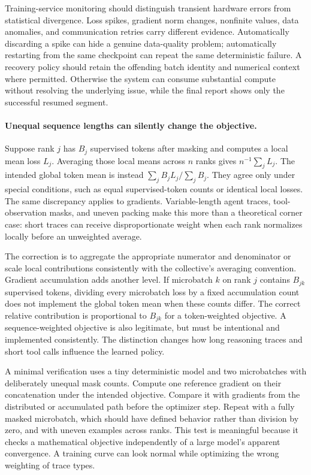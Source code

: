 Training-service monitoring should distinguish transient hardware errors from statistical divergence. Loss spikes, gradient norm changes, nonfinite values, data anomalies, and communication retries carry different evidence. Automatically discarding a spike can hide a genuine data-quality problem; automatically restarting from the same checkpoint can repeat the same deterministic failure. A recovery policy should retain the offending batch identity and numerical context where permitted. Otherwise the system can consume substantial compute without resolving the underlying issue, while the final report shows only the successful resumed segment.

\paragraph{Unequal sequence lengths can silently change the objective.}
Suppose rank $j$ has $B_j$ supervised tokens after masking and computes a local mean loss $L_j$. Averaging those local means across $n$ ranks gives $n^{-1}\sum_jL_j$. The intended global token mean is instead $\sum_j B_jL_j/\sum_jB_j$. They agree only under special conditions, such as equal supervised-token counts or identical local losses. The same discrepancy applies to gradients. Variable-length agent traces, tool-observation masks, and uneven packing make this more than a theoretical corner case: short traces can receive disproportionate weight when each rank normalizes locally before an unweighted average.

The correction is to aggregate the appropriate numerator and denominator or scale local contributions consistently with the collective's averaging convention. Gradient accumulation adds another level. If microbatch $k$ on rank $j$ contains $B_{jk}$ supervised tokens, dividing every microbatch loss by a fixed accumulation count does not implement the global token mean when these counts differ. The correct relative contribution is proportional to $B_{jk}$ for a token-weighted objective. A sequence-weighted objective is also legitimate, but must be intentional and implemented consistently. The distinction changes how long reasoning traces and short tool calls influence the learned policy.

A minimal verification uses a tiny deterministic model and two microbatches with deliberately unequal mask counts. Compute one reference gradient on their concatenation under the intended objective. Compare it with gradients from the distributed or accumulated path before the optimizer step. Repeat with a fully masked microbatch, which should have defined behavior rather than division by zero, and with uneven examples across ranks. This test is meaningful because it checks a mathematical objective independently of a large model's apparent convergence. A training curve can look normal while optimizing the wrong weighting of trace types.

